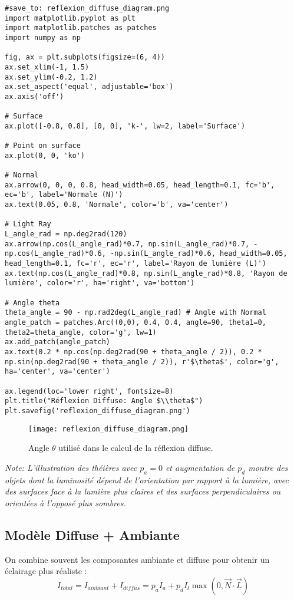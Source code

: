 \documentclass{article}
\begin{document}
\begin{verbatim}
#save_to: reflexion_diffuse_diagram.png
import matplotlib.pyplot as plt
import matplotlib.patches as patches
import numpy as np

fig, ax = plt.subplots(figsize=(6, 4))
ax.set_xlim(-1, 1.5)
ax.set_ylim(-0.2, 1.2)
ax.set_aspect('equal', adjustable='box')
ax.axis('off')

# Surface
ax.plot([-0.8, 0.8], [0, 0], 'k-', lw=2, label='Surface')

# Point on surface
ax.plot(0, 0, 'ko')

# Normal
ax.arrow(0, 0, 0, 0.8, head_width=0.05, head_length=0.1, fc='b', ec='b', label='Normale (N)')
ax.text(0.05, 0.8, 'Normale', color='b', va='center')

# Light Ray
L_angle_rad = np.deg2rad(120)
ax.arrow(np.cos(L_angle_rad)*0.7, np.sin(L_angle_rad)*0.7, -np.cos(L_angle_rad)*0.6, -np.sin(L_angle_rad)*0.6, head_width=0.05, head_length=0.1, fc='r', ec='r', label='Rayon de lumière (L)')
ax.text(np.cos(L_angle_rad)*0.8, np.sin(L_angle_rad)*0.8, 'Rayon de lumière', color='r', ha='right', va='bottom')

# Angle theta
theta_angle = 90 - np.rad2deg(L_angle_rad) # Angle with Normal
angle_patch = patches.Arc((0,0), 0.4, 0.4, angle=90, theta1=0, theta2=theta_angle, color='g', lw=1)
ax.add_patch(angle_patch)
ax.text(0.2 * np.cos(np.deg2rad(90 + theta_angle / 2)), 0.2 * np.sin(np.deg2rad(90 + theta_angle / 2)), r'$\theta$', color='g', ha='center', va='center')

ax.legend(loc='lower right', fontsize=8)
plt.title("Réflexion Diffuse: Angle $\\theta$")
plt.savefig('reflexion_diffuse_diagram.png')
\end{verbatim}

\begin{figure}[H]
\centering
\texttt{[image: reflexion\_diffuse\_diagram.png]}
\caption{Angle $\theta$ utilisé dans le calcul de la réflexion diffuse.}
\label{fig:reflexion_diffuse_diagram}
\end{figure}

\textit{Note: L'illustration des théières avec $p_a=0$ et augmentation de $p_d$ montre des objets dont la luminosité dépend de l'orientation par rapport à la lumière, avec des surfaces face à la lumière plus claires et des surfaces perpendiculaires ou orientées à l'opposé plus sombres.}

\subsection{Modèle Diffuse + Ambiante}
On combine souvent les composantes ambiante et diffuse pour obtenir un éclairage plus réaliste :
\[ I_{total} = I_{ambiant} + I_{diffus} = p_a I_a + p_d I_l \max(0, \vec{N} \cdot \vec{L}) \]
\end{document}
